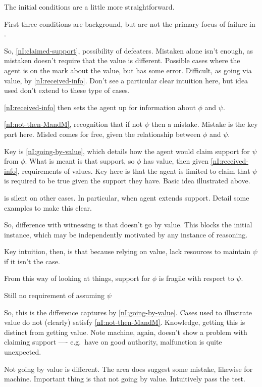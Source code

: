 \begin{note}[Conditions]
  The initial conditions are a little more straightforward.

  First three conditions are background, but are not the primary focus of failure in \nI{}.

  So, \ref{nI:claimed-support}, possibility of defeaters.
  Mistaken alone isn't enough, as mistaken doesn't require that the value is different.
  Possible cases where the agent is on the mark about the value, but has some error.
  Difficult, as going via value, by \ref{nI:received-info}.
  Don't see a particular clear intuition here, but idea used don't extend to these type of cases.


  \ref{nI:received-info} then sets the agent up for information about \(\phi\) and \(\psi\).

  \ref{nI:not-then-MandM}, recognition that if not \(\psi\) then a mistake.
  Mistake is the key part here.
  Misled comes for free, given the relationship between \(\phi\) and \(\psi\).

  Key is \ref{nI:going-by-value}, which details how the agent would claim support for \(\psi\) from \(\phi\).
  What is meant is that support, so \(\phi\) has value, then given \ref{nI:received-info}, requirements of values.
  Key here is that the agent is limited to claim that \(\psi\) is required to be true given the support they have.
  Basic idea illustrated above.

  \nI{} is silent on other cases.
  In particular, when agent extends support.
  Detail some examples to make this clear.

  So, difference with witnessing is that doesn't go by value.
  This blocks the initial instance, which may be independently motivated by any instance of reasoning.

  Key intuition, then, is that because relying on value, lack resources to maintain \(\psi\) if it isn't the case.

  From this way of looking at things, support for \(\phi\) is fragile with respect to \(\psi\).

  Still no requirement of assuming \(\psi\)
\end{note}

\begin{note}
  So, this is the difference captures by \ref{nI:going-by-value}.
  Cases used to illustrate value do not (clearly) satisfy \ref{nI:not-then-MandM}.
  Knowledge, getting this is distinct from getting value.
  Note machine, again, doesn't show a problem with claiming support ---- e.g.\ have on good authority, malfunction is quite unexpected.

  Not going by value is different.
  The area does suggest some mistake, likewise for machine.
  Important thing is that not going by value.
  Intuitively pass the \eit{} test.
\end{note}

